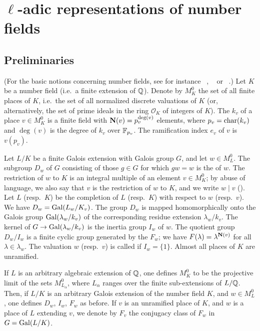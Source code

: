 \section{\texorpdfstring{$\ell$}{ℓ}-adic representations of number fields}
\label{sec:I_2}

\subsection{Preliminaries}%
\label{sec:I_21}
(For the basic notions concerning number fields, see for instance
\citeauthor{6}~\cite{6}, \citeauthor{13}~\cite{13} or
\citeauthor{44}~\cite{44}.)
Let $K$ be a number field (i.e.\ a finite extension of $\mathbb{Q}$). Denote by $M_K^0$
the set of all finite places of $K$, i.e.\, the set of all normalized discrete
valuations of $K$ (or, alternatively, the set of prime ideals in the ring
$\mathcal{O}_K$ of integers of $K$).
The  $k_v$ of a place $v \in M_K^0$
is a finite field with $\operatorname{\mathbf{N}}(v) = p_v^{\deg(v)}$ elements, where
\dpage
$p_v = \operatorname{char}(k_v)$ and $\deg(v)$ is the degree of $k_v$ over $\mathbb{F}_{p_v}$. The
ramification index $e_v$ of $v$ is $v(p_v)$.

Let $L/K$ be a finite Galois extension with Galois group $G$,
and let $w \in M_L^0$.
The subgroup $D_w$ of $G$ consisting of those $g \in G$ for which $gw = w$ is
the  of $w$.
The restriction of $w$ to $K$ is an integral multiple of an element $v \in
M_K^0$; by abuse of language, we also say that $v$ is the restriction of $w$ to
$K$, and we write $w \mid v$ ().
Let $L$ (resp.\ $K$) be the completion of $L$ (resp.\ $K$) with respect to $w$
(resp.\ $v$). We have $D_w = \operatorname{Gal}(L_w/K_v)$. The group $D_w$ is mapped
homomorphically onto the Galois group $\operatorname{Gal}(\lambda_w/k_v)$ of the corresponding
residue extension $\lambda_w/k_v$. The kernel of $G \to \operatorname{Gal}(\lambda_w/k_v)$ is
the inertia group $I_w$ of $w$. The quotient group $D_w/I_w$ is a finite cyclic
group generated by the 
$F_w$; we have $F(\lambda) = \lambda^{\operatorname{\mathbf{N}}(v)}$ for all $\lambda \in
\lambda_w$.
The valuation $w$ (resp.\ $v$) is called  if $I_w = \{ 1 \}$.
Almost all places of $K$ are unramified.

If $L$ is an arbitrary algebraic extension of $\mathbb{Q}$, one defines $M_K^0$ to be
the projective limit of the sets $M_{L_\alpha}^0$, where $L_\alpha$ ranges
over the finite sub-extensions of $L/\mathbb{Q}$. Then, if $L/K$ is an 
arbitrary Galois extension of the number field $K$, and $w \in M_L^0$, one
defines $D_w$, $I_w$, $F_w$ as before. If $v$ is an unramified place of $K$,
and $w$ is a place of $L$ extending $v$, we denote by $F_v$ the conjugacy
class of $F_w$ in $G = \operatorname{Gal}(L/K)$.

